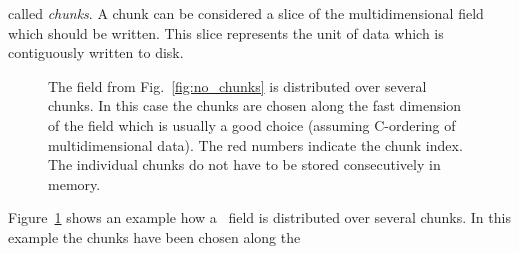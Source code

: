 called \emph{chunks}. A chunk can be considered a slice of the multidimensional
field which should be written. This slice represents the unit of data which 
is contiguously written to disk. 
\begin{figure}[tb]
    \centering
    \caption{{\small\label{fig:with_chunks}
    The field from Fig.~\ref{fig:no_chunks} is distributed over several chunks. 
    In this case the chunks are chosen along the fast dimension of the field 
    which is usually a good choice (assuming C-ordering of multidimensional
    data). The red numbers indicate the chunk index. The individual chunks do
    not have to be stored consecutively  in memory.
    }}
\end{figure}
Figure~\ref{fig:with_chunks} shows an example how a \nexus\ field is distributed
over several chunks. In this example the chunks have been chosen along the 
